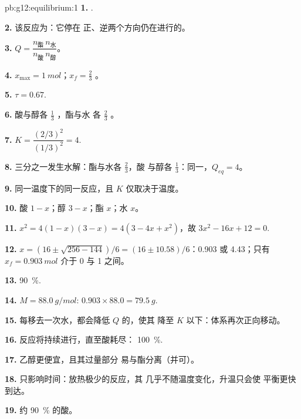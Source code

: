 \begin{solution}{pb:g12:equilibrium:1}
\textbf{1.} .

\textbf{2.} 该反应为：它停在
正、逆两个方向仍在进行的。

\textbf{3.} $Q = \dfrac{n_{\text{酯}}\, n_{\text{水}}}{n_{\text{酸}}\, n_{\text{醇}}}$。

\textbf{4.} $x_{\max} = \qty{1}{mol}$；$x_f = \frac{2}{3}$ 。

\textbf{5.} $\tau = 0.67$.

\textbf{6.} 酸与醇各 $\frac{1}{3}$ ，酯与水
各 $\frac{2}{3}$ 。

\textbf{7.} $K = \dfrac{(2/3)^2}{(1/3)^2} = 4$.

\textbf{8.} 三分之一发生水解：酯与水各 $\frac{2}{3}$，酸
与醇各 $\frac{1}{3}$：同一，$Q_{eq} = 4$。

\textbf{9.} 同一温度下的同一反应，且 $K$
仅取决于温度。

\textbf{10.} 酸 $1 - x$；醇 $3 - x$；酯 $x$；水 $x$。

\textbf{11.} $x^2 = 4(1 - x)(3 - x) = 4(3 - 4x + x^2)$，故
$3x^2 - 16x + 12 = 0$.

\textbf{12.} $x = (16 \pm \sqrt{256 - 144})/6 = (16 \pm 10.58)/6$：0.903
或 4.43；只有 $x_f = \qty{0.903}{mol}$ 介于 0 与 1 之间。

\textbf{13.} \qty{90}{\percent}.

\textbf{14.} $M = \qty{88.0}{g/mol}$: $0.903 \times 88.0 = \qty{79.5}{g}$.

\textbf{15.} 每移去一次水，都会降低 $Q$ 的，使其
降至 $K$ 以下：体系再次正向移动。

\textbf{16.} 反应将持续进行，直至酸耗尽：
\qty{100}{\percent}.

\textbf{17.} 乙醇更便宜，且其过量部分
易与酯分离（并可）。

\textbf{18.} 只影响时间：放热极少的反应，其
几乎不随温度变化，升温只会使
平衡更快到达。

\textbf{19.} 约 \qty{90}{\percent} 的酸。
\end{solution}
